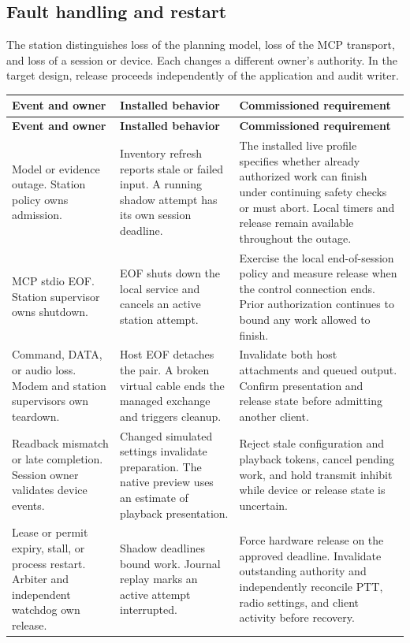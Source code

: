\subsection{Fault handling and restart}

The station distinguishes loss of the planning model, loss of the MCP
transport, and loss of a session or device. Each changes a different
owner's authority. In the target design, release proceeds independently
of the application and audit writer.

{\small
\setlength{\LTleft}{0pt}
\setlength{\LTright}{\fill}
\begin{longtable}{@{}>{\raggedright\arraybackslash}p{.21\linewidth}
  >{\raggedright\arraybackslash}p{.34\linewidth}
  >{\raggedright\arraybackslash}p{.38\linewidth}@{}}
\toprule
\textbf{Event and owner} & \textbf{Installed behavior} & \textbf{Commissioned requirement}\\
\midrule
\endfirsthead
\toprule
\textbf{Event and owner} & \textbf{Installed behavior} & \textbf{Commissioned requirement}\\
\midrule
\endhead
\bottomrule
\endfoot
Model or evidence outage.
Station policy owns admission. &
Inventory refresh reports stale or failed input. A running shadow attempt
has its own session deadline. &
The installed live profile specifies whether already authorized work
can finish under continuing safety checks or must abort. Local timers
and release remain available throughout the outage.\\
\addlinespace
MCP stdio EOF.
Station supervisor owns shutdown. &
EOF shuts down the local service and cancels an active station attempt. &
Exercise the local end-of-session policy and measure release when the
control connection ends. Prior authorization continues to bound any
work allowed to finish.\\
\addlinespace
Command, DATA, or audio loss.
Modem and station supervisors own teardown. &
Host EOF detaches the pair. A broken virtual cable ends the managed
exchange and triggers cleanup. &
Invalidate both host attachments and queued output. Confirm presentation
and release state before admitting another client.\\
\addlinespace
Readback mismatch or late completion.
Session owner validates device events. &
Changed simulated settings invalidate preparation. The native preview
uses an estimate of playback presentation. &
Reject stale configuration and playback tokens, cancel pending work,
and hold transmit inhibit while device or release state is uncertain.\\
\addlinespace
Lease or permit expiry, stall, or process restart.
Arbiter and independent watchdog own release. &
Shadow deadlines bound work. Journal replay marks an active attempt
interrupted. &
Force hardware release on the approved deadline. Invalidate outstanding
authority and independently reconcile PTT, radio settings, and client
activity before recovery.\\
\end{longtable}
}

